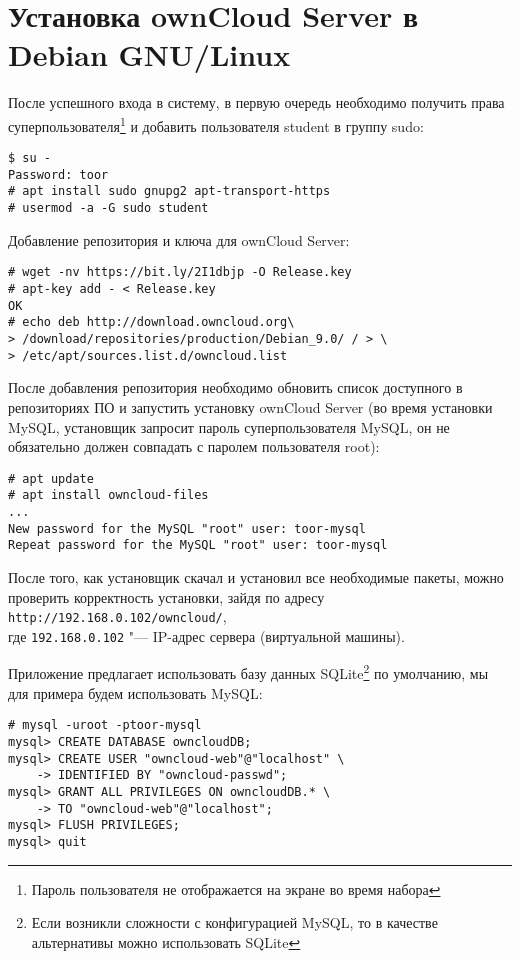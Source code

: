 \section{Установка ownCloud Server в Debian GNU/Linux} \label{pril:c}

После успешного входа в систему, в первую очередь необходимо получить права суперпользователя\footnote{Пароль пользователя не отображается на экране во время набора} и добавить пользователя student в группу sudo:
\begin{lstlisting}
$ su -
Password: toor
# apt install sudo gnupg2 apt-transport-https
# usermod -a -G sudo student
\end{lstlisting}

Добавление репозитория и ключа для ownCloud Server:
\begin{lstlisting}
# wget -nv https://bit.ly/2I1dbjp -O Release.key
# apt-key add - < Release.key
OK
# echo deb http://download.owncloud.org\
> /download/repositories/production/Debian_9.0/ / > \
> /etc/apt/sources.list.d/owncloud.list
\end{lstlisting}

После добавления репозитория необходимо обновить список доступного в репозиториях ПО и запустить установку ownCloud Server (во время установки MySQL, установщик запросит пароль суперпользователя MySQL, он не обязательно должен совпадать с паролем пользователя root):
\begin{lstlisting}
# apt update
# apt install owncloud-files
...
New password for the MySQL "root" user: toor-mysql
Repeat password for the MySQL "root" user: toor-mysql
\end{lstlisting}

После того, как установщик скачал и установил все необходимые пакеты, можно проверить корректность установки, зайдя по адресу \texttt{http://192.168.0.102/owncloud/}, \\
где \texttt{192.168.0.102} "--- IP-адрес сервера (виртуальной машины).

Приложение предлагает использовать базу данных SQLite\footnote{Если возникли сложности с конфигурацией MySQL, то в качестве альтернативы можно использовать SQLite} по умолчанию, мы для примера будем использовать MySQL:
\begin{lstlisting}
# mysql -uroot -ptoor-mysql
mysql> CREATE DATABASE owncloudDB;
mysql> CREATE USER "owncloud-web"@"localhost" \
    -> IDENTIFIED BY "owncloud-passwd";
mysql> GRANT ALL PRIVILEGES ON owncloudDB.* \
    -> TO "owncloud-web"@"localhost";
mysql> FLUSH PRIVILEGES;
mysql> quit
\end{lstlisting}

